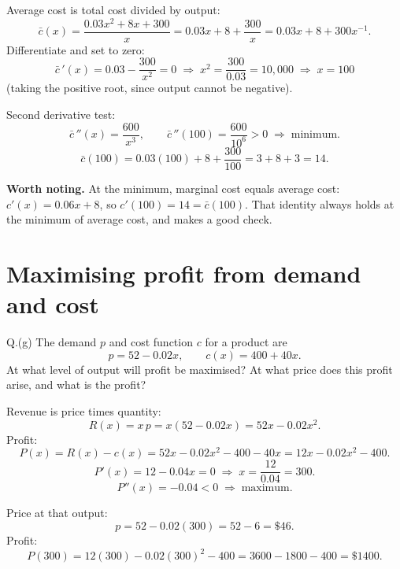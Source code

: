 \begin{solution}
Average cost is total cost divided by output:
\[
\bar{c}(x)=\frac{0.03x^{2}+8x+300}{x}=0.03x+8+\frac{300}{x}
=0.03x+8+300x^{-1}.
\]
Differentiate and set to zero:
\[
\bar{c}\,'(x)=0.03-\frac{300}{x^{2}}=0
\;\Longrightarrow\;
x^{2}=\frac{300}{0.03}=10{,}000
\;\Longrightarrow\;
x=100
\]
(taking the positive root, since output cannot be negative).

Second derivative test:
\[
\bar{c}\,''(x)=\frac{600}{x^{3}},\qquad \bar{c}\,''(100)=\frac{600}{10^{6}}>0
\;\Longrightarrow\;\text{minimum}.
\]
\[
\bar{c}(100)=0.03(100)+8+\frac{300}{100}=3+8+3=14 .
\]


\medskip
\textbf{Worth noting.} At the minimum, marginal cost equals average cost:
$c'(x)=0.06x+8$, so $c'(100)=14=\bar{c}(100)$. That identity always holds at
the minimum of average cost, and makes a good check.

\end{solution}

\section{Maximising profit from demand and cost}

\begin{question}{Q.(g)}
The demand $p$ and cost function $c$ for a product are
\[
p=52-0.02x,\qquad c(x)=400+40x .
\]
At what level of output will profit be maximised? At what price does this
profit arise, and what is the profit?
\end{question}

\begin{solution}
Revenue is price times quantity:
\[
R(x)=x\,p=x(52-0.02x)=52x-0.02x^{2}.
\]
Profit:
\[
P(x)=R(x)-c(x)=52x-0.02x^{2}-400-40x=12x-0.02x^{2}-400 .
\]
\[
P'(x)=12-0.04x=0 \;\Longrightarrow\; x=\frac{12}{0.04}=300 .
\]
\[
P''(x)=-0.04<0 \;\Longrightarrow\; \text{maximum}.
\]

Price at that output:
\[
p=52-0.02(300)=52-6=\$46 .
\]
Profit:
\[
P(300)=12(300)-0.02(300)^{2}-400=3600-1800-400=\$1400 .
\]


\end{solution}

